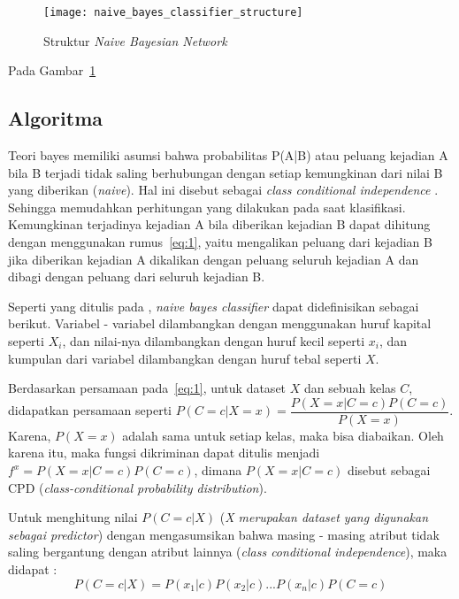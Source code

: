 \begin{figure}[H]
\centering
\texttt{[image: naive\_bayes\_classifier\_structure]}
\caption[Struktur \textit{Naive Bayesian Network}]{Struktur \textit{Naive Bayesian Network}}
\label{fig:Struktur Naive Bayesian Network}
\end{figure}
	Pada Gambar~\ref{fig:Struktur Naive Bayesian Network}

\subsection{Algoritma}

	 Teori bayes memiliki asumsi bahwa probabilitas P(A|B) atau peluang kejadian A bila B terjadi tidak saling berhubungan dengan setiap kemungkinan dari nilai B yang diberikan (\textit{naive}). Hal ini disebut sebagai \textit{class conditional independence} . Sehingga memudahkan perhitungan yang dilakukan pada saat klasifikasi. Kemungkinan terjadinya kejadian A bila diberikan kejadian B dapat dihitung dengan menggunakan rumus~\ref{eq:1}, yaitu mengalikan peluang dari kejadian B jika diberikan kejadian A dikalikan dengan peluang seluruh kejadian A dan dibagi dengan peluang dari seluruh kejadian B.

	Seperti yang ditulis pada \cite{rish2001empirical}, \textit{naive bayes classifier} dapat didefinisikan sebagai berikut. Variabel - variabel dilambangkan dengan menggunakan huruf kapital seperti $X_i$, dan nilai-nya dilambangkan dengan huruf kecil seperti $x_i$, dan kumpulan dari variabel dilambangkan dengan huruf tebal seperti \textbf{$X$}.

Berdasarkan persamaan pada~\ref{eq:1}, untuk dataset $X$ dan sebuah kelas $C$, didapatkan persamaan seperti $P(C=c|X=x) = \dfrac{P(X=x|C=c)P(C=c)}{P(X=x)}$. Karena, $P(X=x)$ adalah sama untuk setiap kelas, maka bisa diabaikan. Oleh karena itu, maka fungsi dikriminan dapat ditulis menjadi $f^x = P(X=x|C=c)P(C=c)$, dimana $P(X=x|C=c)$ disebut sebagai CPD (\textit{class-conditional probability distribution}).

Untuk menghitung nilai $P(C=c|X)$ (\textit{X merupakan dataset yang digunakan sebagai predictor}) dengan mengasumsikan bahwa masing - masing atribut tidak saling bergantung dengan atribut lainnya (\textit{class conditional independence}), maka didapat : 
\begin{equation}
	P(C=c|X) = P(x_1|c) P(x_2|c) ... P(x_n|c) P(C=c)
\end{equation}

